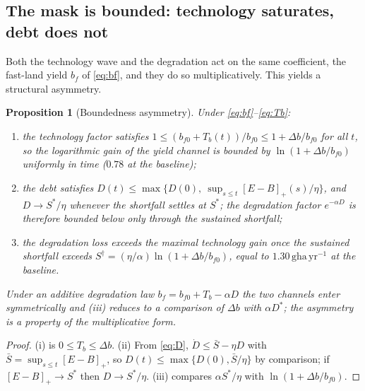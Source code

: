 \documentclass[preprint,12pt,authoryear]{elsarticle}
\newtheorem{proposition}{Proposition}
\newcommand{\pos}[1]{\left[#1\right]_+}
\begin{document}
\subsection{The mask is bounded: technology saturates, debt does not}\label{sec:bounded}

Both the technology wave and the degradation act on the same coefficient, the fast-land yield $b_f$ of \eqref{eq:bf}, and they do so multiplicatively. This yields a structural asymmetry.

\begin{proposition}[Boundedness asymmetry]\label{prop:bounded}
Under \eqref{eq:bf}--\eqref{eq:Tb}:
\begin{enumerate}[label=(\roman*)]
\item the technology factor satisfies $1\le(b_{f0}+T_b(t))/b_{f0}\le1+\Delta b/b_{f0}$ for all $t$, so the logarithmic gain of the yield channel is bounded by $\ln(1+\Delta b/b_{f0})$ uniformly in time ($0.78$ at the baseline);
\item the debt satisfies $D(t)\le\max\{D(0),\ \sup_{s\le t}\pos{E-B}(s)/\eta\}$, and $D\to S^*/\eta$ whenever the shortfall settles at $S^*$; the degradation factor $e^{-\alpha D}$ is therefore bounded below only through the sustained shortfall;
\item the degradation loss exceeds the maximal technology gain once the sustained shortfall exceeds $S^\dagger=(\eta/\alpha)\ln(1+\Delta b/b_{f0})$, equal to $1.30\,\mathrm{gha\,yr^{-1}}$ at the baseline.
\end{enumerate}
Under an additive degradation law $b_f=b_{f0}+T_b-\alpha D$ the two channels enter symmetrically and (iii) reduces to a comparison of $\Delta b$ with $\alpha D^*$; the asymmetry is a property of the multiplicative form.
\end{proposition}

\begin{proof}
(i) is $0\le T_b\le\Delta b$. (ii) From \eqref{eq:D}, $\dot D\le\bar S-\eta D$ with $\bar S=\sup_{s\le t}\pos{E-B}$, so $D(t)\le\max\{D(0),\bar S/\eta\}$ by comparison; if $\pos{E-B}\to S^*$ then $D\to S^*/\eta$. (iii) compares $\alpha S^*/\eta$ with $\ln(1+\Delta b/b_{f0})$.
\end{proof}
\end{document}
